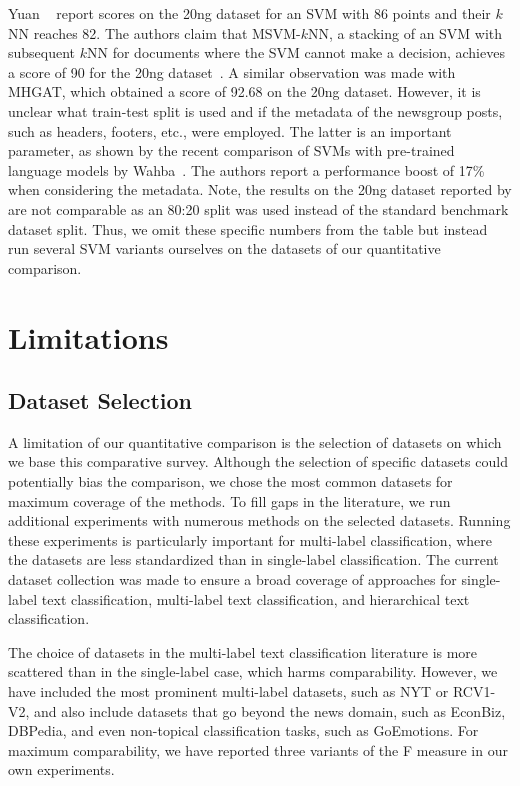 \documentclass[acmsmall,nonacm]{acmart}
\begin{document}
Yuan \etal~\cite{YuanEtAl-MSVM-kNN-2008} report scores on the 20ng dataset for an SVM with 86 points and their $k$NN reaches 82.
The authors claim that MSVM-$k$NN, a stacking of an SVM with subsequent $k$NN for documents where the SVM cannot make a decision, achieves a score of 90 for the 20ng dataset~\cite{YuanEtAl-MSVM-kNN-2008}.
A similar observation was made with MHGAT, which obtained a score of 92.68 on the 20ng dataset.
However, it is unclear what train-test split is used and if the metadata of the newsgroup posts, such as headers, footers, etc., were employed.
The latter is an important parameter, as shown by the recent comparison of SVMs with pre-trained language models by Wahba~\etal\cite{DBLP:journals/corr/abs-2211-02563}.
The authors report a performance boost of 17\% when considering the metadata. 
Note, the results on the 20ng dataset reported by \cite{DBLP:journals/corr/abs-2211-02563} are not comparable as an 80:20 split was used instead of the standard benchmark dataset split.
Thus, we omit these specific numbers from the table but instead run several SVM variants ourselves on the datasets of our quantitative comparison.

\section{Limitations}\label{sec:limitations}

\subsection{Dataset Selection}
A limitation of our quantitative comparison is the selection of datasets on which we base this comparative survey. 
Although the selection of specific datasets could potentially bias the comparison, we chose the most common datasets for maximum coverage of the methods. 
To fill gaps in the literature, we run additional experiments with numerous methods on the selected datasets. 
Running these experiments is particularly important for multi-label classification, where the datasets are less standardized than in single-label classification. 
The current dataset collection was made to ensure a broad coverage of approaches for single-label text classification, multi-label text classification, and hierarchical text classification. 

The choice of datasets in the multi-label text classification literature is more scattered than in the single-label case, which harms comparability. 
However, we have included the most prominent multi-label datasets, such as NYT or RCV1-V2, and also include datasets that go beyond the news domain, such as EconBiz, DBPedia, and even non-topical classification tasks, such as GoEmotions. 
For maximum comparability, we have reported three variants of the F measure in our own experiments.
\end{document}
